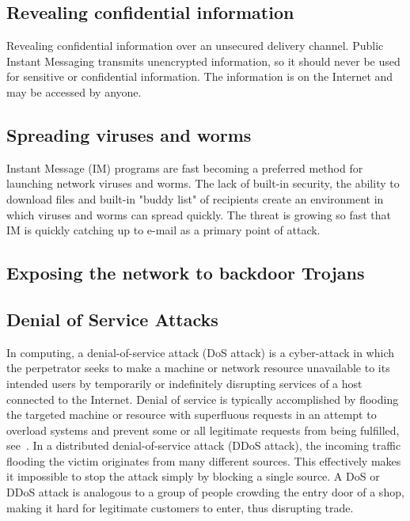 \subsection{Revealing confidential information}\label{subsec:revealing-confidential-information}
Revealing confidential information over an unsecured delivery channel.
Public Instant Messaging transmits unencrypted information, so it should never be used for sensitive or confidential
information.
The information is on the Internet and may be accessed by anyone.

\subsection{Spreading viruses and worms}\label{subsec:spreading-viruses-and-worms}
Instant Message (IM) programs are fast becoming a preferred method for launching network viruses and worms.
The lack of built-in security, the ability to download files and built-in "buddy list" of recipients create an
environment in which viruses and worms can spread quickly.
The threat is growing so fast that IM is quickly catching up to e-mail as a primary point of attack.

\subsection{Exposing the network to backdoor Trojans}\label{subsec:exposing-the-network-to-backdoor-trojans}

\subsection{Denial of Service Attacks}\label{subsec:denial-of-service-attacks}

In computing, a denial-of-service attack (DoS attack) is a cyber-attack in which the perpetrator seeks to make a machine or
network resource unavailable to its intended users by temporarily or indefinitely disrupting services of a host connected
to the Internet.
Denial of service is typically accomplished by flooding the targeted machine or resource with superfluous requests in
an attempt to overload systems and prevent some or all legitimate requests from being fulfilled, see~\cite{gu2007denial}.
In a distributed denial-of-service attack (DDoS attack), the incoming traffic flooding the victim originates from
many different sources.
This effectively makes it impossible to stop the attack simply by blocking a single source.
A DoS or DDoS attack is analogous to a group of people crowding the entry door of a shop, making it hard for legitimate
customers to enter, thus disrupting trade.

